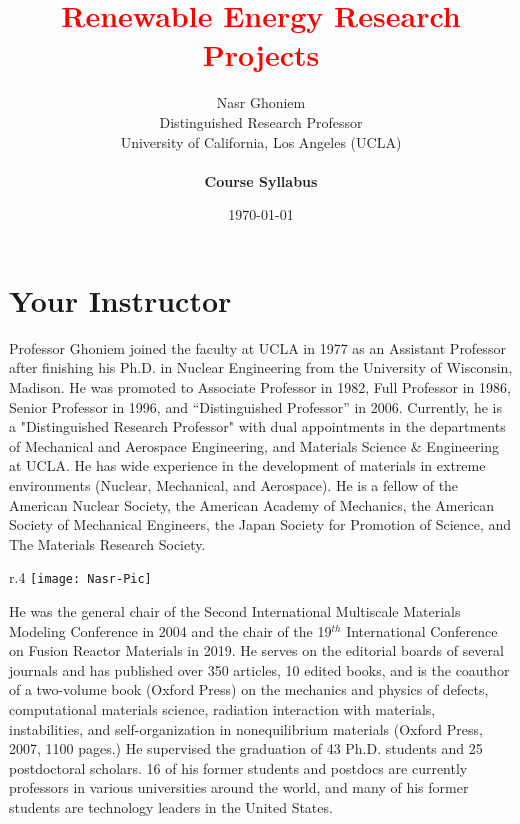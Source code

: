 \documentclass[11pt]{article}
\title{{\Huge\textcolor{red}{Renewable Energy Research Projects}}}
\author{Nasr Ghoniem\\Distinguished Research Professor\\University of California, Los Angeles (UCLA)\\~ \\\textbf{Course Syllabus}}
\date{\today}
\begin{document}
\maketitle
\tableofcontents
\newpage
\section{Your Instructor}
Professor Ghoniem joined the faculty at UCLA in 1977 as an Assistant Professor after finishing his
Ph.D. in Nuclear Engineering from the University of Wisconsin, Madison. He was promoted to
Associate Professor in 1982, Full Professor in 1986, Senior Professor in 1996, and “Distinguished
Professor” in 2006. Currently, he is a "Distinguished Research Professor" with dual appointments in the departments of Mechanical and Aerospace Engineering, and Materials Science \& Engineering at UCLA. He has wide experience in the development of materials in extreme environments (Nuclear, Mechanical, and Aerospace). He is a fellow of the American Nuclear Society, the American Academy of Mechanics, the American Society of Mechanical Engineers, the Japan Society for Promotion of Science, and The Materials Research Society.
\begin{wrapfigure}{r}{.4\textwidth}
	\texttt{[image: Nasr-Pic]}
\end{wrapfigure}

He was the general chair of the Second International Multiscale Materials Modeling Conference in 2004 and the chair of the 19$^{th}$ International Conference on Fusion Reactor Materials in 2019.  He serves on the editorial boards of several journals and has published over 350 articles, 10 edited books, and is the coauthor of a two-volume book (Oxford Press) on the mechanics and physics of defects, computational materials science, radiation interaction with materials, instabilities, and self-organization in nonequilibrium materials (Oxford Press, 2007, 1100 pages.)  He supervised the graduation of 43 Ph.D. students and 25 postdoctoral scholars. 16 of his former students and postdocs are currently professors in various universities around the world, and many of his former students are technology leaders in the United States. 
\end{document}
